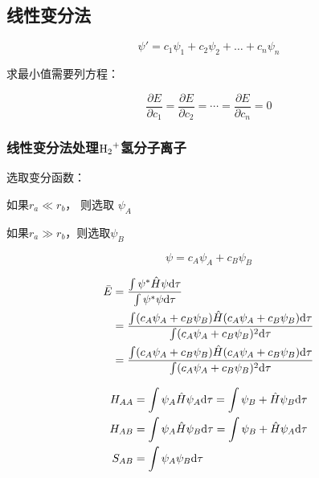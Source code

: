 \subsection{线性变分法}

\begin{equation*}
	\psi ' = c_1 \psi_1 + c_2 \psi_2 + \dots + c_n \psi_n
\end{equation*}


求最小值需要列方程：


\begin{equation*}
	\frac{\partial E}{\partial c_1} = \frac{\partial E}{\partial c_2} = \cdots = \frac{\partial E}{\partial c_n} = 0
\end{equation*}



\subsubsection{线性变分法处理$\ce{H2+}$氢分子离子}

选取变分函数：


如果$r_a \ll r_b$， 则选取 $\psi_A$

如果$r_a \gg r_b$，则选取$\psi_B$

\begin{equation*}
	\psi = c_A \psi_A + c_B \psi_B
\end{equation*}

\begin{align*}
	\bar{E} & = \frac{\int \psi^* \hat{H} \psi \mathrm{d} \tau}{\int \psi^*  \psi \mathrm{d} \tau}                                                   \\
	        & = \frac{\int (c_A\psi_A + c_B\psi_B) \hat{H} ( c_A\psi_A + c_B\psi_B) \mathrm{d} \tau}{\int (c_A\psi_A + c_B\psi_B)^2 \mathrm{d} \tau} \\
	        & = \frac{\int (c_A\psi_A + c_B\psi_B) \hat{H} ( c_A\psi_A + c_B\psi_B) \mathrm{d} \tau}{\int (c_A\psi_A + c_B\psi_B)^2 \mathrm{d} \tau} \\
\end{align*}


\begin{align*}
	H_{AA} & = \int \psi_A \hat{H} \psi_A \mathrm{d} \tau = \int \psi_B + \hat{H} \psi_B \mathrm{d} \tau \\
	H_{AB} & = \int \psi_A \hat{H} \psi_B \mathrm{d} \tau = \int \psi_B + \hat{H} \psi_A \mathrm{d} \tau \\
	S_{AB} & = \int \psi_A \psi_B \mathrm{d} \tau
\end{align*}



